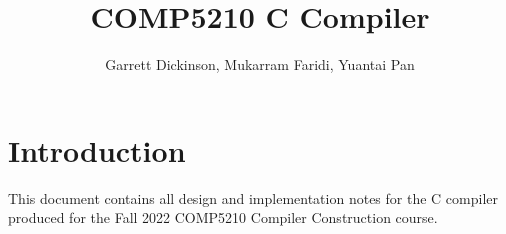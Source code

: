 \documentclass{ol-softwaremanual}
\title{COMP5210 C Compiler}
\author{Garrett Dickinson, Mukarram Faridi, Yuantai Pan}
\begin{document}
\maketitle

\newpage

\section{Introduction}

This document contains all design and implementation notes for the C compiler produced for the Fall 2022 
COMP5210 Compiler Construction course. 

%


%
\end{document}
